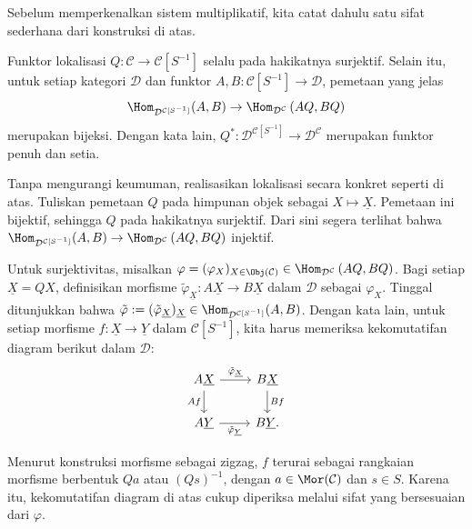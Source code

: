Sebelum memperkenalkan sistem multiplikatif, kita catat dahulu satu sifat
sederhana dari konstruksi di atas.

\begin{proposisi}\label{prop:localization-extra-property}
	Funktor lokalisasi
	$Q: \mathcal{C} \to \mathcal{C}[S^{-1}]$ selalu pada hakikatnya
	surjektif. Selain itu, untuk setiap kategori $\mathcal{D}$ dan funktor
	$A, B: \mathcal{C}[S^{-1}] \to \mathcal{D}$, pemetaan yang jelas
	\[ \Hom_{\mathcal{D}^{\mathcal{C}[S^{-1}]}}(A, B) \to \Hom_{\mathcal{D}^{\mathcal{C}}}\left( AQ, BQ \right) \]
	merupakan bijeksi. Dengan kata lain,
	$Q^*: \mathcal{D}^{\mathcal{C}[S^{-1}]} \to
	\mathcal{D}^{\mathcal{C}}$ merupakan funktor penuh dan setia.
\end{proposisi}
\begin{bukti}
	Tanpa mengurangi keumuman, realisasikan lokalisasi secara konkret seperti
	di atas. Tuliskan pemetaan $Q$ pada himpunan objek sebagai
	$X \mapsto \underline{X}$. Pemetaan ini bijektif, sehingga $Q$ pada
	hakikatnya surjektif. Dari sini segera terlihat bahwa
	$\Hom_{\mathcal{D}^{\mathcal{C}[S^{-1}]}}(A, B) \to
	\Hom_{\mathcal{D}^{\mathcal{C}}}\left( AQ, BQ \right)$ injektif.

	Untuk surjektivitas, misalkan
	$\varphi = (\varphi_X)_{X \in \Obj(\mathcal{C})} \in
	\Hom_{\mathcal{D}^{\mathcal{C}}}\left( AQ, BQ \right)$. Bagi setiap
	$\underline{X} = QX$, definisikan morfisme
	$\tilde{\varphi}_{\underline{X}}: A\underline{X} \to B\underline{X}$
	dalam $\mathcal{D}$ sebagai $\varphi_X$. Tinggal ditunjukkan bahwa
	$\tilde{\varphi} := (\tilde{\varphi}_{\underline{X}})_{\underline{X}}
	\in \Hom_{\mathcal{D}^{\mathcal{C}[S^{-1}]}}(A, B)$. Dengan kata lain,
	untuk setiap morfisme $f: \underline{X} \to \underline{Y}$ dalam
	$\mathcal{C}[S^{-1}]$, kita harus memeriksa kekomutatifan diagram berikut
	dalam $\mathcal{D}$:
	\[\begin{tikzcd}
		A\underline{X} \arrow[r, "{\tilde{\varphi}_{\underline{X}}}"] \arrow[d, "Af"'] & B\underline{X} \arrow[d, "Bf"] \\
		A\underline{Y} \arrow[r, "{\tilde{\varphi}_{\underline{Y}}}"'] & B\underline{Y} .
	\end{tikzcd}\]

	Menurut konstruksi morfisme sebagai zigzag, $f$ terurai sebagai rangkaian
	morfisme berbentuk $Qa$ atau $(Qs)^{-1}$, dengan
	$a \in \Mor(\mathcal{C})$ dan $s \in S$. Karena itu, kekomutatifan diagram
	di atas cukup diperiksa melalui sifat yang bersesuaian dari $\varphi$.
\end{bukti}


